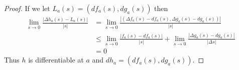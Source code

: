 \begin{proof}
If we let \( L_a(s) = (df_a(s),dg_a(s)) \) then
\begin{align*}
    \lim_{s \rightarrow 0} \frac{\left| \Delta h_a(s) - L_a(s) \right|}{\left| s \right|} &= \lim_{s \rightarrow 0} \frac{\left| (\Delta f_a(s)-df_a(s), \Delta g_a(s)-dg_a(s)) \right|}{\left| s \right|} \\
    &\leq \lim_{s \rightarrow 0} \frac{\left| f_a(s)-df_a(s) \right|}{\left| s  \right|} + \lim_{s \rightarrow 0} \frac{\left| \Delta g_a(s)-dg_a(s) \right|}{\left| \Delta s \right|} \\
    &= 0
\end{align*}
Thus \( h \) is differentiable at \( a \) and \( dh_a = (df_a(s),dg_a(s)) \).
\end{proof}